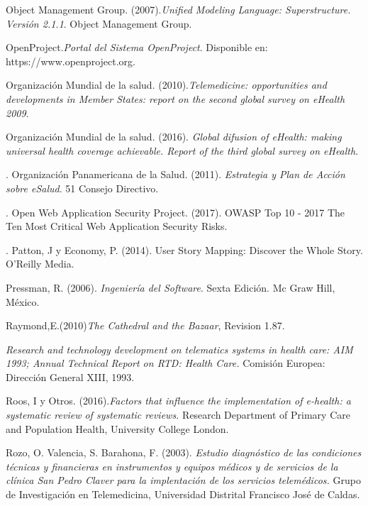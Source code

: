 \begin{thebibliography}{}
 Object Management Group. (2007).\textit{Unified Modeling Language: Superstructure. Versión 2.1.1}. Object Management Group.

 OpenProject.\textit{Portal del Sistema OpenProject}. Disponible en: https://www.openproject.org.

 Organización Mundial de la salud. (2010).\textit{Telemedicine: opportunities and developments in Member States: report on the second global survey on eHealth 2009}. 

 Organización Mundial de la salud. (2016). \textit{Global difusion of eHealth: making universal health coverage achievable. Report of the third global survey on eHealth}. 

. Organización Panamericana de la Salud. (2011). \textit{Estrategia y Plan de Acción sobre eSalud}. 51 Consejo Directivo.

. Open Web Application Security Project. (2017). OWASP Top 10 - 2017 The Ten Most Critical Web Application Security Risks. 

. Patton, J y Economy, P. (2014). User Story Mapping: Discover the Whole Story. O'Reilly Media.

 Pressman, R. (2006). \textit{Ingeniería del Software}. Sexta Edición. Mc Graw 
Hill, México.

 Raymond,E.(2010)\textit{The Cathedral and the Bazaar}, Revision 1.87.

 \textit{Research and technology development on telematics systems in health care: AIM 1993; Annual Technical Report on RTD: Health Care.} Comisión Europea: Dirección General XIII, 1993.

 Roos, I y Otros. (2016).\textit{Factors that influence the implementation of e-health: a systematic review of systematic reviews.} Research Department of Primary Care and Population Health, University College London.

 Rozo, O. Valencia, S. Barahona, F. (2003). \textit{Estudio diagnóstico de las condiciones técnicas y financieras en instrumentos y equipos médicos  y de servicios de la clínica San Pedro Claver para la implentación de los servicios telemédicos.} Grupo de Investigación en Telemedicina,  Universidad Distrital Francisco José de Caldas.


\end{thebibliography}

